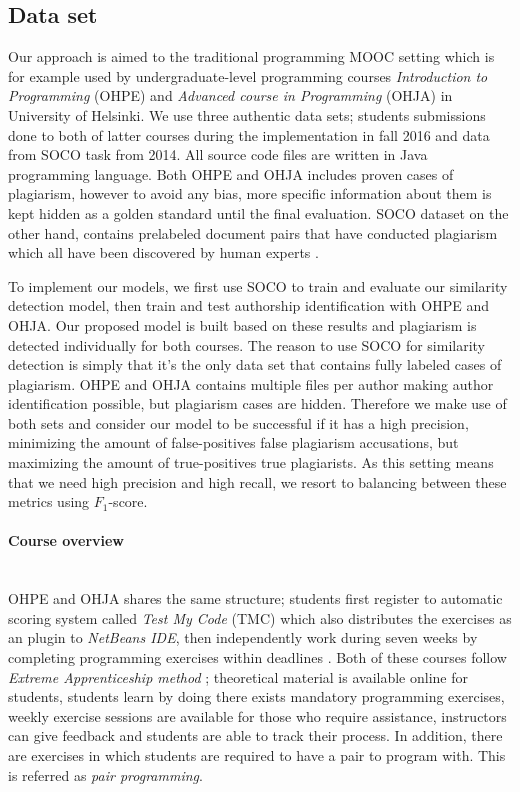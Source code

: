 \subsection{Data set}

Our approach is aimed to the traditional programming MOOC setting which is for example used by  undergraduate-level programming courses \emph{Introduction to Programming} (OHPE) and \emph{Advanced course in Programming} (OHJA) in University of Helsinki. We use three authentic data sets; students submissions done to both of latter courses during the implementation in fall 2016 and data from SOCO task from 2014. All source code files are written in Java programming language. Both OHPE and OHJA includes proven cases of plagiarism, however to avoid any bias, more specific information about them is kept hidden as a golden standard  until the final evaluation. SOCO dataset on the other hand, contains prelabeled document pairs that have conducted plagiarism which all have been discovered by human experts \cite{saez2014pan}.

To implement our models, we first use SOCO to train and evaluate our similarity detection model, then train and test authorship identification with OHPE and OHJA. Our proposed model is built based on these results and plagiarism is detected individually for both courses. The reason to use SOCO for similarity detection is simply that it's the only data set that contains fully labeled cases of plagiarism. OHPE and OHJA contains multiple files per author making author identification possible, but plagiarism cases are hidden. Therefore we make use of both sets and consider our model to be successful if it has a high precision, minimizing the amount of false-positives \ie false plagiarism accusations, but maximizing the amount of true-positives \ie true plagiarists. As this setting means that we need high precision and high recall, we resort to balancing between these metrics using $F_1$-score. 

\paragraph{Course overview}\mbox{}\\
OHPE and OHJA shares the same structure; students first register to automatic scoring system called \emph{Test My Code} (TMC) \cite{Vihavainen:2013:SSL:2462476.2462501} which also distributes the exercises as an plugin to \emph{NetBeans IDE}, then independently work during seven weeks by completing programming exercises within deadlines \cite{Vihavainen:2012:MSM:2380552.2380603}. Both of these courses follow \emph{Extreme Apprenticeship method} \cite{Vihavainen:2011:EAM:1953163.1953196}; theoretical material is available online for students, students learn by doing \ie there exists mandatory programming exercises, weekly exercise sessions are available for those who require assistance, instructors can give feedback and students are able to track their process. In addition, there are exercises in which students are required to have a pair to program with. This is referred as \emph{pair programming}.

